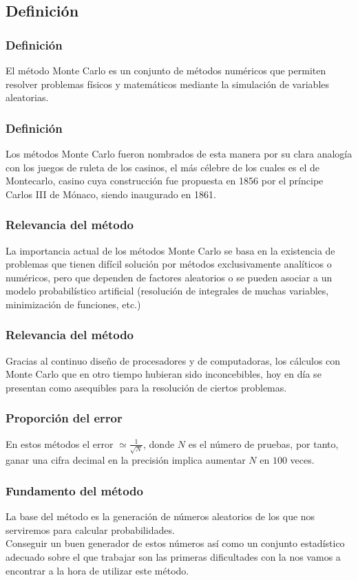 \subsection{Definición}
\begin{frame}
\frametitle{Definición}
El método Monte Carlo es un conjunto de métodos numéricos que permiten resolver problemas físicos y matemáticos mediante la simulación de variables aleatorias.
\end{frame}
\begin{frame}
\frametitle{Definición}
Los métodos Monte Carlo fueron nombrados de esta manera por su clara analogía con los juegos de ruleta de los casinos, el más célebre de los cuales es el de Montecarlo, casino cuya construcción fue propuesta en 1856 por el príncipe Carlos III de Mónaco, siendo inaugurado en 1861.
\end{frame}
\begin{frame}
\frametitle{Relevancia del método}
La importancia actual de los métodos Monte Carlo se basa en la existencia de problemas que tienen difícil solución por métodos exclusivamente analíticos o numéricos, pero que dependen de factores aleatorios o se pueden asociar a un modelo probabilístico artificial (resolución de integrales de muchas variables, minimización de funciones, etc.)
\end{frame}
\begin{frame}
\frametitle{Relevancia del método}
Gracias al continuo diseño de procesadores y de computadoras, los cálculos con Monte Carlo que en otro tiempo hubieran sido inconcebibles, hoy en día se presentan como asequibles para la resolución de ciertos problemas.
\end{frame}
\begin{frame}
 \frametitle{Proporción del error}
En estos métodos el error $\simeq \frac{1}{\sqrt{N}}$, donde $N$ es el número de pruebas, por tanto, ganar una cifra decimal en la precisión implica aumentar $N$ en $100$ veces.
\end{frame}
\begin{frame}
 \frametitle{Fundamento del método}
La base del método es la generación de números aleatorios de los que nos serviremos para calcular probabilidades.
\\
\bigskip
Conseguir un buen generador de estos números así como un conjunto estadístico adecuado sobre el que trabajar son las primeras dificultades con la nos vamos a encontrar a la hora de utilizar este método.
\end{frame}
